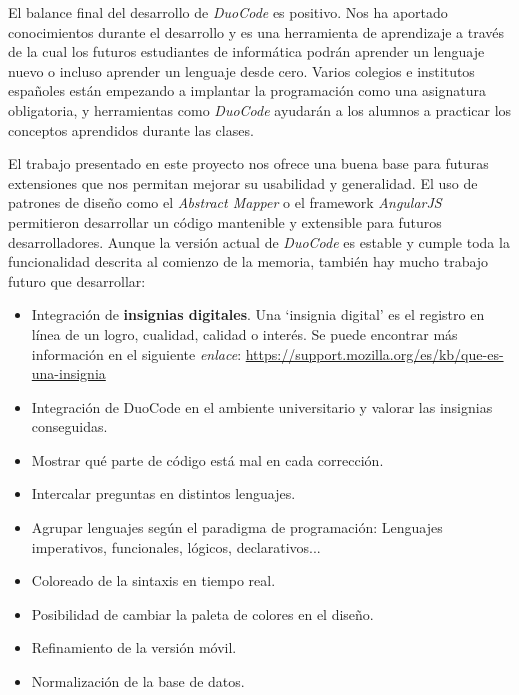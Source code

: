 El balance final del desarrollo de \textit{DuoCode} es positivo. Nos ha aportado conocimientos durante el desarrollo y es una herramienta de aprendizaje a través de la cual los futuros estudiantes de informática podrán aprender un lenguaje nuevo o incluso aprender un lenguaje desde cero.
Varios colegios e institutos españoles están empezando a implantar la programación como una asignatura obligatoria, y herramientas como \textit{DuoCode} ayudarán a los alumnos a practicar los conceptos aprendidos durante las clases.

El trabajo presentado en este proyecto nos ofrece una buena base para futuras extensiones que nos permitan mejorar su usabilidad y generalidad. El uso de patrones de diseño como el \textit{Abstract Mapper} o el framework \textit{AngularJS} permitieron desarrollar un código mantenible y extensible para futuros desarrolladores. Aunque la versión actual de \textit{DuoCode} es estable y cumple toda la funcionalidad descrita al comienzo de la memoria, también hay mucho trabajo futuro que desarrollar:
\begin{itemize}
\item Integración de \textbf{insignias digitales}. Una `insignia digital' es el registro en línea de un logro, cualidad, calidad o interés. Se puede encontrar más información en el siguiente \textit{enlace}: \url{https://support.mozilla.org/es/kb/que-es-una-insignia}

\item Integración de DuoCode en el ambiente universitario y valorar las insignias conseguidas.

\item Mostrar qué parte de código está mal en cada corrección.

\item Intercalar preguntas en distintos lenguajes.

\item Agrupar lenguajes según el paradigma de programación: Lenguajes imperativos, funcionales, lógicos, declarativos...

\item Coloreado de la sintaxis en tiempo real.

\item Posibilidad de cambiar la paleta de colores en el diseño.

\item Refinamiento de la versión móvil.

\item Normalización de la base de datos.

\end{itemize}